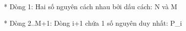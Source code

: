 * Dòng 1: Hai số nguyên cách nhau bởi dấu cách: N và M  

   * Dòng 2..M+1: Dòng i+1 chứa 1 số nguyên duy nhất: P\_i  

\